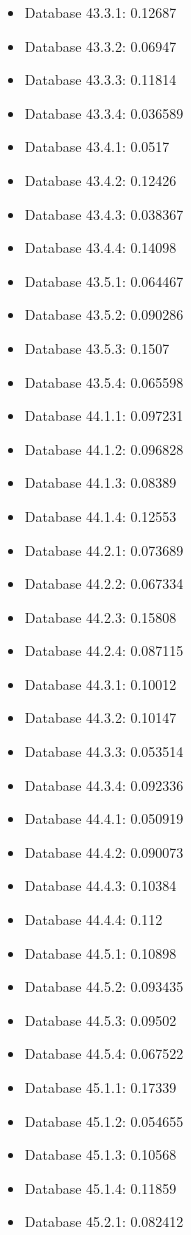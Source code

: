 \begin{itemize}
\item Database 43.3.1: 0.12687
\item Database 43.3.2: 0.06947
\item Database 43.3.3: 0.11814
\item Database 43.3.4: 0.036589
\item Database 43.4.1: 0.0517
\item Database 43.4.2: 0.12426
\item Database 43.4.3: 0.038367
\item Database 43.4.4: 0.14098
\item Database 43.5.1: 0.064467
\item Database 43.5.2: 0.090286
\item Database 43.5.3: 0.1507
\item Database 43.5.4: 0.065598
\item Database 44.1.1: 0.097231
\item Database 44.1.2: 0.096828
\item Database 44.1.3: 0.08389
\item Database 44.1.4: 0.12553
\item Database 44.2.1: 0.073689
\item Database 44.2.2: 0.067334
\item Database 44.2.3: 0.15808
\item Database 44.2.4: 0.087115
\item Database 44.3.1: 0.10012
\item Database 44.3.2: 0.10147
\item Database 44.3.3: 0.053514
\item Database 44.3.4: 0.092336
\item Database 44.4.1: 0.050919
\item Database 44.4.2: 0.090073
\item Database 44.4.3: 0.10384
\item Database 44.4.4: 0.112
\item Database 44.5.1: 0.10898
\item Database 44.5.2: 0.093435
\item Database 44.5.3: 0.09502
\item Database 44.5.4: 0.067522
\item Database 45.1.1: 0.17339
\item Database 45.1.2: 0.054655
\item Database 45.1.3: 0.10568
\item Database 45.1.4: 0.11859
\item Database 45.2.1: 0.082412

\end{itemize}
